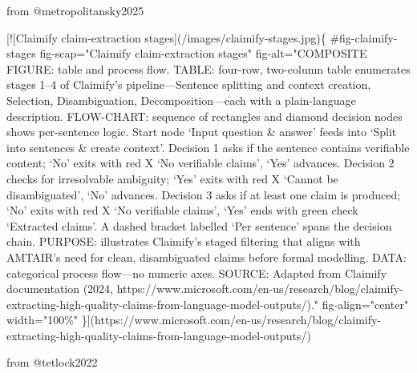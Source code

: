 \documentclass[
  11pt,
  letterpaper,
]{book}
\newenvironment{Shaded}{\begin{snugshade}}{\end{snugshade}}
\newcommand{\CommentTok}[1]{\textcolor[rgb]{0.37,0.37,0.37}{#1}}
\newcommand{\NormalTok}[1]{\textcolor[rgb]{0.00,0.23,0.31}{#1}}
\newcommand{\OtherTok}[1]{\textcolor[rgb]{0.00,0.23,0.31}{#1}}
\begin{document}
\begin{Shaded}
\begin{Highlighting}[]

\NormalTok{from @metropolitansky2025}

\CommentTok{[}\OtherTok{![Claimify claim{-}extraction stages}\CommentTok{](/images/claimify{-}stages.jpg)}\NormalTok{\{}
\NormalTok{    \#fig{-}claimify{-}stages}
\NormalTok{    fig{-}scap="Claimify claim{-}extraction stages"}
\NormalTok{    fig{-}alt="COMPOSITE FIGURE: table and process flow. TABLE: four{-}row, two{-}column table enumerates stages 1–4 of Claimify’s pipeline—Sentence splitting and context creation, Selection, Disambiguation, Decomposition—each with a plain{-}language description. FLOW{-}CHART: sequence of rectangles and diamond decision nodes shows per{-}sentence logic. Start node ‘Input question \& answer’ feeds into ‘Split into sentences \& create context’. Decision 1 asks if the sentence contains verifiable content; ‘No’ exits with red X ‘No verifiable claims’, ‘Yes’ advances. Decision 2 checks for irresolvable ambiguity; ‘Yes’ exits with red X ‘Cannot be disambiguated’, ‘No’ advances. Decision 3 asks if at least one claim is produced; ‘No’ exits with red X ‘No verifiable claims’, ‘Yes’ ends with green check ‘Extracted claims’. A dashed bracket labelled ‘Per sentence’ spans the decision chain. PURPOSE: illustrates Claimify’s staged filtering that aligns with AMTAIR’s need for clean, disambiguated claims before formal modelling. DATA: categorical process flow—no numeric axes. SOURCE: Adapted from Claimify documentation (2024, https://www.microsoft.com/en{-}us/research/blog/claimify{-}extracting{-}high{-}quality{-}claims{-}from{-}language{-}model{-}outputs/)."}
\NormalTok{    fig{-}align="center"}
\NormalTok{    width="100\%"}
\NormalTok{\}](https://www.microsoft.com/en{-}us/research/blog/claimify{-}extracting{-}high{-}quality{-}claims{-}from{-}language{-}model{-}outputs/)}



\NormalTok{from @tetlock2022}


\end{Highlighting}
\end{Shaded}
\end{document}
